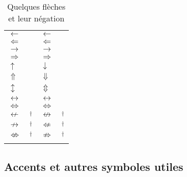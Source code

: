 \begin{table}
  \caption{Quelques flèches et leur négation}
  \label{tab:math:fleches}
  \begin{tabularx}{1.0\linewidth}{lXlX}
    $\gets$                & \cmd{\leftarrow}\quad \cmd{\gets} &
    $\longleftarrow$       & \cmd{\longleftarrow}              \\
    $\Leftarrow$           & \cmd{\Leftarrow}                  &
    $\Longleftarrow$       & \cmd{\Longleftarrow}              \\
    $\to$                  & \cmd{\rightarrow}\quad \cmd{\to}  &
    $\longrightarrow$      & \cmd{\longrightarrow}             \\
    $\Rightarrow$          & \cmd{\Rightarrow}                 &
    $\Longrightarrow$      & \cmd{\Longrightarrow}             \\
    $\uparrow$             & \cmd{\uparrow}                    &
    $\downarrow$           & \cmd{\downarrow}                  \\
    $\Uparrow$             & \cmd{\Uparrow}                    &
    $\Downarrow$           & \cmd{\Downarrow}                  \\
    $\updownarrow$         & \cmd{\updownarrow}                &
    $\Updownarrow$         & \cmd{\Updownarrow}                \\
    $\leftrightarrow$      & \cmd{\leftrightarrow}             &
    $\longleftrightarrow$  & \cmd{\longleftrightarrow}         \\
    $\Leftrightarrow$      & \cmd{\Leftrightarrow}             &
    $\Longleftrightarrow$  & \cmd{\Longleftrightarrow}         \\
    $\nleftarrow$          & \cmd{\nleftarrow}$^\dagger$         &
    $\nleftrightarrow$     & \cmd{\nleftrightarrow}$^\dagger$    \\
    $\nrightarrow$         & \cmd{\nrightarrow}$^\dagger$        &
    $\nLeftarrow$          & \cmd{\nLeftarrow}$^\dagger$         \\
    $\nLeftrightarrow$     & \cmd{\nLeftrightarrow}$^\dagger$    &
    $\nRightarrow$         & \cmd{\nRightarrow}$^\dagger$        \\
    \addlinespace
  \end{tabularx}
\end{table}

\subsection{Accents et autres symboles utiles}
\label{sec:math:symboles:autres}

